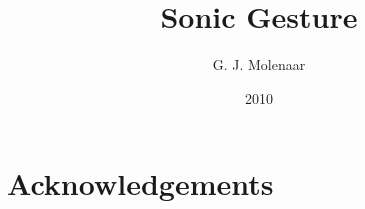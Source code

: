 \documentclass[a4paper]{report}
\begin{document}
\title{Sonic Gesture}
\author{G. J. Molenaar}
\date{2010}

\maketitle

\tableofcontents
\listoffigures
\listoftables

\chapter*{Acknowledgements}

\begin{abstract}
\end{abstract}














\end{document}
